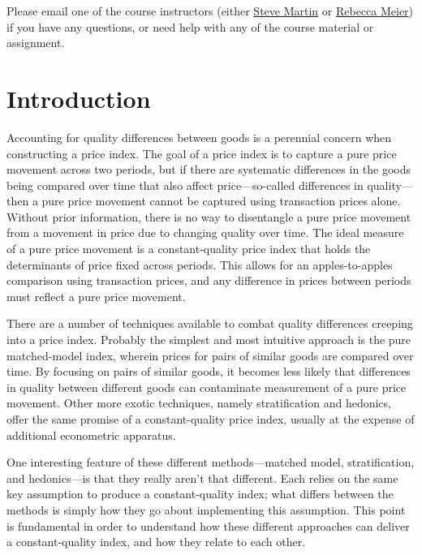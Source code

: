 \documentclass[]{article}
\begin{document}
Please email one of the course instructors (either \href{mailto:steve.martin5@canada.ca}{Steve Martin} or \href{mailto:rebecca.meier@canada.ca}{Rebecca Meier}) if you have any questions, or need help with any of the course material or assignment.

\hypertarget{introduction}{%
\section{Introduction}\label{introduction}}

Accounting for quality differences between goods is a perennial concern when constructing a price index. The goal of a price index is to capture a pure price movement across two periods, but if there are systematic differences in the goods being compared over time that also affect price---so-called differences in quality---then a pure price movement cannot be captured using transaction prices alone. Without prior information, there is no way to disentangle a pure price movement from a movement in price due to changing quality over time. The ideal measure of a pure price movement is a constant-quality price index that holds the determinants of price fixed across periods. This allows for an apples-to-apples comparison using transaction prices, and any difference in prices between periods must reflect a pure price movement.

There are a number of techniques available to combat quality differences creeping into a price index. Probably the simplest and most intuitive approach is the pure matched-model index, wherein prices for pairs of similar goods are compared over time. By focusing on pairs of similar goods, it becomes less likely that differences in quality between different goods can contaminate measurement of a pure price movement. Other more exotic techniques, namely stratification and hedonics, offer the same promise of a constant-quality price index, usually at the expense of additional econometric apparatus.

One interesting feature of these different methods---matched model, stratification, and hedonics---is that they really aren't that different. Each relies on the same key assumption to produce a constant-quality index; what differs between the methods is simply how they go about implementing this assumption. This point is fundamental in order to understand how these different approaches can deliver a constant-quality index, and how they relate to each other.
\end{document}
